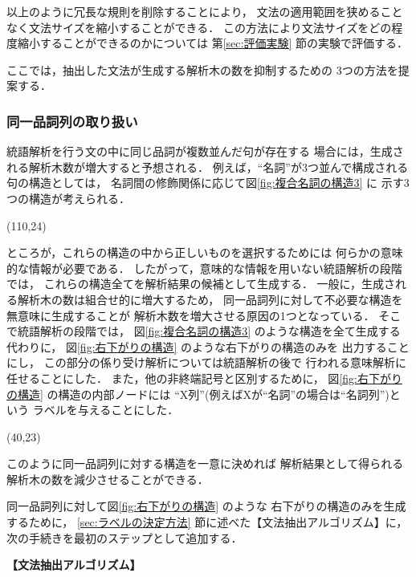 以上のように冗長な規則を削除することにより，
文法の適用範囲を狭めることなく文法サイズを縮小することができる．
この方法により文法サイズをどの程度縮小することができるのかについては
第\ref{sec:評価実験} 節の実験で評価する．



ここでは，抽出した文法が生成する解析木の数を抑制するための
3つの方法を提案する．
\subsubsection{同一品詞列の取り扱い}


統語解析を行う文の中に同じ品詞が複数並んだ句が存在する
場合には，生成される解析木数が増大すると予想される．
例えば，``名詞''が3つ並んで構成される句の構造としては，
名詞間の修飾関係に応じて図\ref{fig:複合名詞の構造3} に
示す3つの構造が考えられる．
\begin{center}
  \atari(110,24)
\end{center}

ところが，これらの構造の中から正しいものを選択するためには
何らかの意味的な情報が必要である．
したがって，意味的な情報を用いない統語解析の段階では，
これらの構造全てを解析結果の候補として生成する．
一般に，生成される解析木の数は組合せ的に増大するため，
同一品詞列に対して不必要な構造を無意味に生成することが
解析木数を増大させる原因の1つとなっている．
そこで統語解析の段階では，
図\ref{fig:複合名詞の構造3} のような構造を全て生成する代わりに，
図\ref{fig:右下がりの構造} のような右下がりの構造のみを
出力することにし，
この部分の係り受け解析については統語解析の後で
行われる意味解析に任せることにした．
また，他の非終端記号と区別するために，
図\ref{fig:右下がりの構造} の構造の内部ノードには
``X列''(例えばXが``名詞''の場合は``名詞列'')という
ラベルを与えることにした．

\begin{center}
  \atari(40,23)
\end{center}

\noindent
このように同一品詞列に対する構造を一意に決めれば
解析結果として得られる解析木の数を減少させることができる．

同一品詞列に対して図\ref{fig:右下がりの構造} のような
右下がりの構造のみを生成するために，
\ref{sec:ラベルの決定方法} 節に述べた【文法抽出アルゴリズム】に，
次の手続きを最初のステップとして追加する．

\newpage
\begin{flushleft}
  {\bf 【文法抽出アルゴリズム】}
  \vspace*{-3mm}
\end{flushleft}


